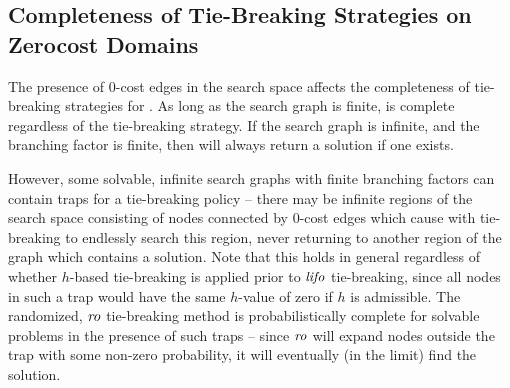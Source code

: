 \subsection{Completeness of Tie-Breaking Strategies on Zerocost Domains}

The presence of 0-cost edges in the search space affects the completeness of tie-breaking strategies for \astar. 
As long as the search graph is finite, \astar is complete regardless of the tie-breaking strategy.
If the search graph is infinite, and the branching factor is finite, then 
\fifo will always return a solution if one exists.

However, some solvable, infinite search graphs with finite branching factors can contain traps for a \lifo tie-breaking policy -- there may be infinite regions of the search space consisting of nodes connected by 0-cost edges which cause \astar with \lifo tie-breaking to endlessly search this region, never returning to another region of the graph which contains a solution.
Note that this holds in general regardless of whether $h$-based tie-breaking is applied prior to ${\text{\textit{lifo}}}$ tie-breaking, since all nodes in such a trap would have the same $h$-value of zero if $h$ is admissible.
The randomized, ${\text{\textit{ro}}}$ tie-breaking method is probabilistically complete for solvable problems in the presence of such traps -- since ${\text{\textit{ro}}}$ will expand nodes outside the trap with some non-zero probability, it will eventually (in the limit) find the solution.

